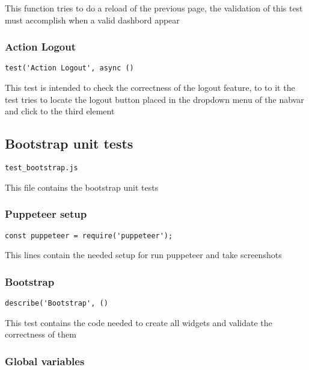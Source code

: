 \documentclass[a4paper]{article}
\begin{document}
This function tries to do a reload of the previous page, the validation of
this test must accomplish when a valid dashbord appear

\hypertarget{toc469}{}
\subsubsection{Action Logout}

\begin{lstlisting}
test('Action Logout', async ()
\end{lstlisting}

This test is intended to check the correctness of the logout feature, to
to it the test tries to locate the logout button placed in the dropdown
menu of the nabvar and click to the third element

\hypertarget{toc470}{}
\subsection{Bootstrap unit tests}

\begin{lstlisting}
test_bootstrap.js
\end{lstlisting}

This file contains the bootstrap unit tests

\hypertarget{toc471}{}
\subsubsection{Puppeteer setup}

\begin{lstlisting}
const puppeteer = require('puppeteer');
\end{lstlisting}

This lines contain the needed setup for run puppeteer and take screenshots

\hypertarget{toc472}{}
\subsubsection{Bootstrap}

\begin{lstlisting}
describe('Bootstrap', ()
\end{lstlisting}

This test contains the code needed to create all widgets and validate the
correctness of them

\hypertarget{toc473}{}
\subsubsection{Global variables}
\end{document}
